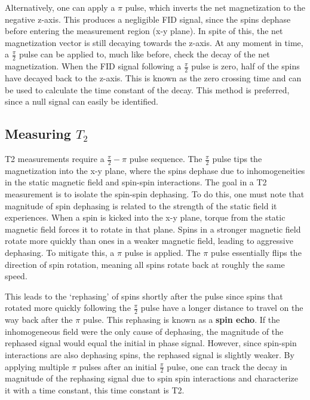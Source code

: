 \documentclass[%
 reprint,
 amsmath,amssymb,
 aps,
]{revtex4-2}
\newcommand{\halfpi}{\frac{\pi}{2}}
\begin{document}
Alternatively, one can apply a $\pi$ pulse, which inverts the net magnetization to the negative z-axis. This produces a negligible FID signal, since the spins dephase before entering the measurement region (x-y plane). In spite of this, the net magnetization vector is still decaying towards the z-axis. At any moment in time, a $\halfpi$ pulse can be applied to, much like before, check the decay of the net magnetization. When the FID signal following a $\halfpi$ pulse is zero, half of the spins have decayed back to the z-axis. This is known as the zero crossing time and can be used to calculate the time constant of the decay. This method is preferred, since a null signal can easily be identified. 


\subsection{Measuring $T_2$\label{sec:measure-t2}}

T2 measurements require a $\halfpi-\pi$ pulse sequence. The $\halfpi$ pulse tips the magnetization into the x-y plane, where the spins dephase due to inhomogeneities in the static magnetic field and spin-spin interactions. The goal in a T2 measurement is to isolate the spin-spin dephasing.  To do this, one must note that magnitude of spin dephasing is related to the strength of the static field it experiences. When a spin is kicked into the x-y plane, torque from the static magnetic field forces it to rotate in that plane. Spins in a stronger magnetic field rotate more quickly than ones in a weaker magnetic field, leading to aggressive dephasing. To mitigate this, a $\pi$ pulse is applied. The $\pi$ pulse essentially flips the direction of spin rotation, meaning all spins rotate back at roughly the same speed. 

This leads to the `rephasing' of spins shortly after the pulse since spins that rotated more quickly following the $\halfpi$ pulse have a longer distance to travel on the way back after the $\pi$ pulse. This rephasing is known as a \textbf{spin echo}. If the inhomogeneous field were the only cause of dephasing, the magnitude of the rephased signal would equal the initial in phase signal. However, since spin-spin interactions are also dephasing spins, the rephased signal is slightly weaker. By applying multiple $\pi$ pulses after an initial $\halfpi$ pulse, one can track the decay in magnitude of the rephasing signal due to spin spin interactions and characterize it with a time constant, this time constant is T2. 
\end{document}
